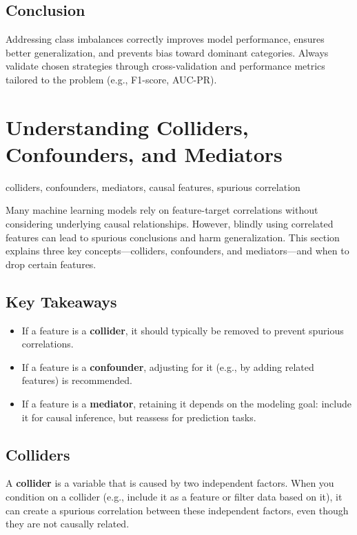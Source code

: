 \documentclass[12pt,openany]{book}
\begin{document}
\subsection{Conclusion}

Addressing class imbalances correctly improves model performance, ensures better generalization, and prevents bias toward dominant categories. Always validate chosen strategies through cross-validation and performance metrics tailored to the problem (e.g., F1-score, AUC-PR).



\section{Understanding Colliders, Confounders, and Mediators}

\begin{keywordsbox}
colliders, confounders, mediators, causal features, spurious correlation
\end{keywordsbox}

Many machine learning models rely on feature-target correlations without considering underlying causal relationships. However, blindly using correlated features can lead to spurious conclusions and harm generalization. This section explains three key concepts—colliders, confounders, and mediators—and when to drop certain features.

\subsection{Key Takeaways}
\begin{itemize}
    \item If a feature is a \textbf{collider}, it should typically be removed to prevent spurious correlations.
    \item If a feature is a \textbf{confounder}, adjusting for it (e.g., by adding related features) is recommended.
    \item If a feature is a \textbf{mediator}, retaining it depends on the modeling goal: include it for causal inference, but reassess for prediction tasks.
\end{itemize}


\subsection{Colliders}

A \textbf{collider} is a variable that is caused by two independent factors. When you condition on a collider (e.g., include it as a feature or filter data based on it), it can create a spurious correlation between these independent factors, even though they are not causally related.
\end{document}
